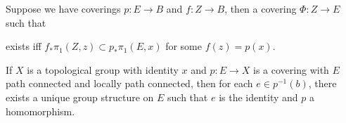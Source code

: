 Suppose we have coverings $p:E\to B$ and $f:Z\to B$, then a covering $\Phi:Z\to E$ such that  exists iff $f_*\pi_1(Z,z)\subset p_*\pi_1(E,x)$ for some $f(z)=p(x)$.

If $X$ is a topological group with identity $x$ and $p:E\to X$ is a covering with $E$ path connected and locally path connected, then for each $e\in p^{-1}(b)$, there exists a unique group structure on $E$ such that $e$ is the identity and $p$ a homomorphism.



